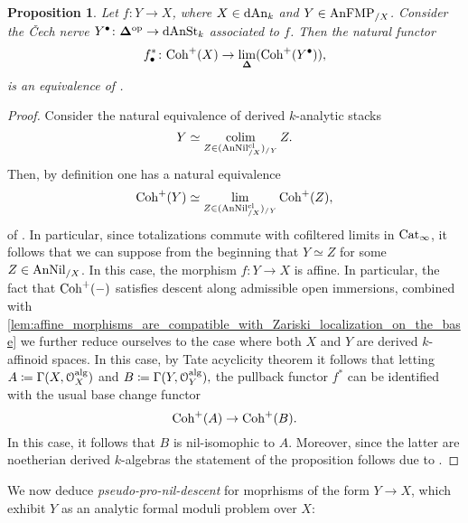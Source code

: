 \documentclass[10pt,a4paper,reqno]{amsart} %
\theoremstyle{plain}
\newtheorem{prop}[thm]{Proposition}
\theoremstyle{definition}
\theoremstyle{remark}
\numberwithin{equation}{section}
\begin{document}
\begin{prop} \label{prop:nil_descent_for_Coh^+}
    Let $f \colon Y \to X$, where $X \in \mathrm{dAn}_k$ and $Y \in \mathrm{AnFMP}_{/X}$. Consider the \v{C}ech nerve
    $Y^\bullet \colon \mathbf \Delta ^\mathrm{op} \to \mathrm{dAnSt}_k$ associated to $f$.
    Then the natural functor
        \[
            f_\bullet^* \colon \mathrm{Coh}^+(X) \to \lim_{\bm{\Delta} }(\mathrm{Coh}^+(Y^\bullet)),  
        \]
    is an equivalence of \infcats.
\end{prop}

\begin{proof}
    Consider the natural equivalence of derived $k$-analytic stacks
        \[
            Y \simeq \operatorname*{colim}_{Z \in (\mathrm{AnNil}^{\mathrm{cl}}_{/X})_{/Y}}  Z.
        \]
    Then, by definition one has a natural equivalence
        \[
            \mathrm{Coh}^+(Y) \simeq \lim_{Z \in (\mathrm{AnNil}^{\mathrm{cl}}_{/X})_{/Y}} \mathrm{Coh}^+(Z),  
        \]
    of \infcats. In particular, since totalizations commute with cofiltered limits in $\mathrm{Cat}_\infty$, it follows that we can suppose from
    the beginning that $Y \simeq Z$ for some $Z \in \mathrm{AnNil}_{/X}$. In this case, the morphism $f \colon Y \to X$ is affine. In particular, the fact that
    $\mathrm{Coh}^+(-)$ satisfies descent along admissible open immersions, combined with \cref{lem:affine_morphisms_are_compatible_with_Zariski_localization_on_the_base} we further reduce ourselves
    to the case where both $X$ and $Y$ are derived $k$-affinoid spaces. In this case, by Tate acyclicity
    theorem it follows that letting $A \coloneqq \Gamma(X, \mathcal O_X ^\mathrm{alg})$ and $B \coloneqq \Gamma(Y, \mathcal O_Y^\mathrm{alg}),$ the pullback functor $f^*$ can be identified with
    the usual base change functor
        \[
            \mathrm{Coh}^+(A) \to \mathrm{Coh}^+(B).  
        \]
    In this case, it follows that $B$ is nil-isomophic to $A$. Moreover, since the latter are noetherian derived $k$-algebras
    the statement of the proposition follows due to \cite[Theorem 3.3.1]{preygel_Leistner_Mapping_stacks_properness}.
\end{proof}

We now deduce \emph{pseudo-pro-nil-descent} for moprhisms of the form $Y \to X$, which exhibit $Y$ as an analytic formal moduli problem over $X$:
\end{document}
